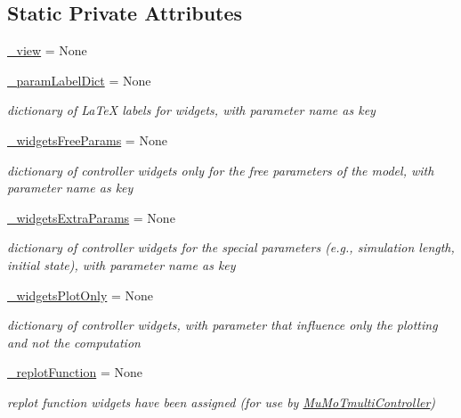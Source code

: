 \subsection*{Static Private Attributes}
\begin{DoxyCompactItemize}
\item 
\hyperlink{class_mu_mo_t_1_1_mu_mo_t_1_1_mu_mo_tcontroller_a27dd8543b5188cdfe40f622d267fe2c5}{\+\_\+view} = None
\item 
\hyperlink{class_mu_mo_t_1_1_mu_mo_t_1_1_mu_mo_tcontroller_a13bcda33e0e971cf4ad2710945226add}{\+\_\+param\+Label\+Dict} = None
\begin{DoxyCompactList}\small\item\em dictionary of La\+TeX labels for widgets, with parameter name as key \end{DoxyCompactList}\item 
\hyperlink{class_mu_mo_t_1_1_mu_mo_t_1_1_mu_mo_tcontroller_aab884266838b2bf42f4ff27cc2041464}{\+\_\+widgets\+Free\+Params} = None
\begin{DoxyCompactList}\small\item\em dictionary of controller widgets only for the free parameters of the model, with parameter name as key \end{DoxyCompactList}\item 
\hyperlink{class_mu_mo_t_1_1_mu_mo_t_1_1_mu_mo_tcontroller_aae2fc2e1d31d0fd22ea078bb930222a4}{\+\_\+widgets\+Extra\+Params} = None
\begin{DoxyCompactList}\small\item\em dictionary of controller widgets for the special parameters (e.\+g., simulation length, initial state), with parameter name as key \end{DoxyCompactList}\item 
\hyperlink{class_mu_mo_t_1_1_mu_mo_t_1_1_mu_mo_tcontroller_af54e883f58d2be155299935e0bf427cb}{\+\_\+widgets\+Plot\+Only} = None
\begin{DoxyCompactList}\small\item\em dictionary of controller widgets, with parameter that influence only the plotting and not the computation \end{DoxyCompactList}\item 
\hyperlink{class_mu_mo_t_1_1_mu_mo_t_1_1_mu_mo_tcontroller_a04e66f2b7e3c67b0e96f318acbfa7f0e}{\+\_\+replot\+Function} = None
\begin{DoxyCompactList}\small\item\em replot function widgets have been assigned (for use by \hyperlink{class_mu_mo_t_1_1_mu_mo_t_1_1_mu_mo_tmulti_controller}{Mu\+Mo\+Tmulti\+Controller}) \end{DoxyCompactList}\item 

\end{DoxyCompactItemize}
